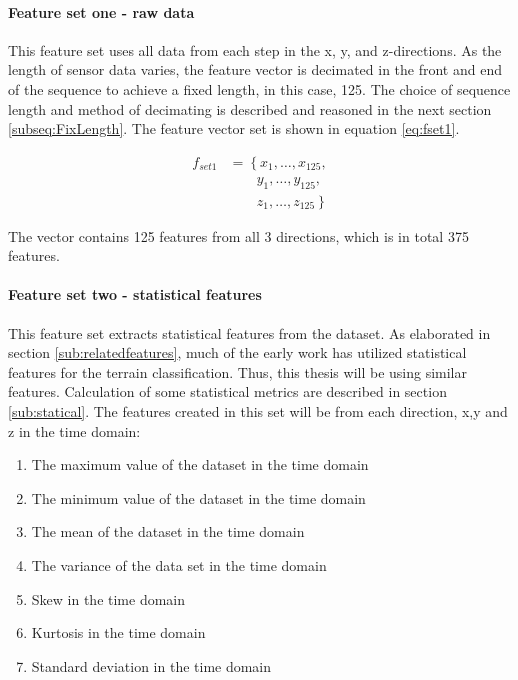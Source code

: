 \documentclass[USenglish]{ifimaster}  %
\begin{document}
\paragraph{Feature set one - raw data} 
This feature set uses all data from each step in the x, y, and z-directions. As the length of sensor data varies, the feature vector is decimated in the front and end of the sequence to achieve a fixed length, in this case, 125. The choice of sequence length and method of decimating is described and reasoned in the next section \ref{subseq:FixLength}. The feature vector set is shown in equation \ref{eq:fset1}.
	

\begin{align}\label{eq:fset1}
f_{set1} &= \left\{x_1,\dotsc,x_{125}, \right.\nonumber\\
&\qquad \left.{} y_1, \dotsc,y_{125}, \right.\nonumber\\
&\qquad \left.{} z_1,\dotsc,z_{125} \right\}
\end{align}

The vector contains 125 features from all 3 directions, which is in total 375 features.
	

		
		
	
\paragraph{Feature set two - statistical features} 
This feature set extracts statistical features from the dataset. As elaborated in section \ref{sub:relatedfeatures}, much of the early work has utilized statistical features for the terrain classification. Thus, this thesis will be using similar features. Calculation of some statistical metrics are described in section \ref{sub:statical}. The features created in this set will be from each direction, x,y and z in the time domain: 

	
	\begin{enumerate}
		\item The maximum value of the dataset in the time domain
		\item The minimum value of the dataset in the time domain
		\item The mean of the dataset in the time domain
		\item The variance of the data set in the time domain
		\item Skew in the time domain
		\item Kurtosis in the time domain 
		\item Standard deviation in the time domain
	\end{enumerate}
	
\end{document}
